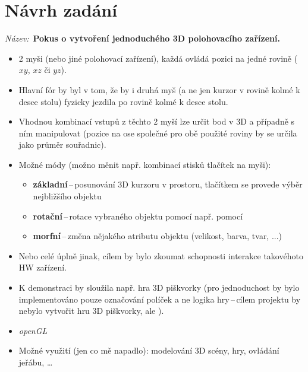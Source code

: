 \documentclass[a4paper,12pt,titlepage]{article}
\begin{document}




\newpage

\appendix

\section{Návrh zadání}\label{zadani}

{\it Název:}~{\bf Pokus o vytvoření jednoduchého 3D polohovacího zařízení.}
\begin{itemize}
\item{2 myši (nebo jiné polohovací zařízení), každá ovládá pozici na jedné
      rovině ($xy$, $xz$ či $yz$).}
\item{Hlavní fór by byl v tom, že by i druhá myš (a ne jen kurzor v rovině kolmé
      k desce stolu) fyzicky jezdila po rovině kolmé k desce stolu.}
\item{Vhodnou kombinací vstupů z těchto 2 myší lze určit bod v 3D a případně
      s ním manipulovat (pozice na ose společné pro obě použité roviny
      by se určila jako průměr souřadnic).}
\item{Možné módy (možno měnit např. kombinací stisků tlačítek na myši):}
    \begin{itemize}
    \item{{\bf základní}\,--\,posunování 3D kurzoru v prostoru,
            tlačítkem se provede výběr nejbližšího objektu}
    \item{{\bf rotační}\,--\,rotace vybraného objektu pomocí např. pomocí
            }
    \item{{\bf morfní}\,--\,změna nějakého atributu objektu
            (velikost, barva, tvar, ...)}
    \end{itemize}
\item{Nebo celé úplně jinak, cílem by bylo zkoumat schopnosti interakce
        takovéhoto HW zařízení.}
\item{K demonstraci by sloužila např. hra 3D piškvorky (pro jednoduchost
        by bylo implementováno pouze označování políček a ne logika
        hry\,--\,cílem projektu by nebylo vytvořit hru 3D piškvorky,
        ale ).}
\item{{\it openGL}}
\item{Možné využití (jen co mě napadlo): modelování 3D scény, hry,
        ovládání jeřábu, \ldots}
\end{itemize}

% 
% 
\end{document}
